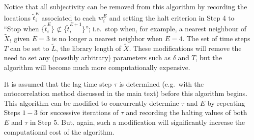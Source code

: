 \documentclass[a4paper,11pt]{article}
\begin{document}
Notice that all subjectivity can be removed from this algorithm by recording the locations $\tilde{t}^E_i$ associated to each $w^E_i$ and setting the halt criterion in Step 4 to ``Stop when $\{\tilde{t}^E_i\}\not \subset \{\tilde{t}^{E+1}_i\}$''; i.e.\ stop when, for example, a nearest neighbour of $\tilde{X}_t$ given $E=3$ is no longer a nearest neighbor when $E=4$.  The set of time steps $T$ can be set to $\tilde{L}$, the library length of $\tilde{X}$.  These modifications will remove the need to set any (possibly arbitrary) parameters such as $\delta$ and $T$, but the algorithm will become much more computationally expensive.

It is assumed that the lag time step $\tau$ is determined (e.g.\ with the autocorrelation method discussed in the main text) before this algorithm begins.  This algorithm can be modified to concurrently determine $\tau$ and $E$ by repeating Steps $1-3$ for successive iterations of $\tau$ and recording the halting values of both $E$ and $\tau$ in Step 5.  But, again, such a modification will significantly increase the computational cost of the algorithm.



\end{document}
